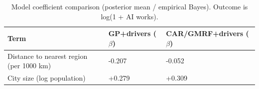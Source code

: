 \begin{table}[ht]
\centering
\begin{tabular}{lll}
\toprule
Term & GP+drivers ($\beta$) & CAR/GMRF+drivers ($\beta$) \\
\midrule
Distance to nearest region (per 1000 km) & -0.207 & -0.052 \\
City size (log population) & +0.279 & +0.309 \\
\bottomrule
\end{tabular}
\caption{Model coefficient comparison (posterior mean / empirical Bayes). Outcome is log(1 + AI works).}
\label{tab:model_coefs}
\end{table}
